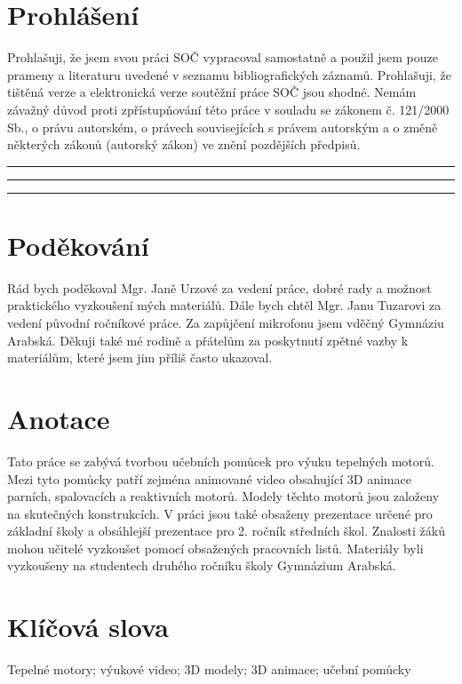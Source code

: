 \newpage

\section*{Prohlášení}
{Prohlašuji, že jsem svou práci SOČ vypracoval samostatně a použil jsem pouze prameny a literaturu uvedené v seznamu bibliografických záznamů.}\odst
{Prohlašuji, že tištěná verze a elektronická verze soutěžní práce SOČ jsou shodné.}\odst
{Nemám závažný důvod proti zpřístupňování této práce v souladu se zákonem č. 121/2000 Sb., o právu autorském, o právech souvisejících s právem autorským a o změně některých zákonů (autorský zákon) ve znění pozdějších předpisů.}\par
\vspace{2cm}
\noindent\rule{3cm}{0.4pt}
\noindent\rule{3cm}{0.4pt}
\hfill
{}
\noindent\rule{5cm}{0.4pt}

\newpage

\section*{Poděkování}
{Rád bych poděkoval Mgr. Janě Urzové za vedení práce, dobré rady a možnost praktického vyzkoušení mých materiálů. Dále bych chtěl Mgr. Janu Tuzarovi za vedení původní ročníkové práce. Za zapůjčení mikrofonu jsem vděčný Gymnáziu Arabská. Děkuji také mé rodině a přátelům za poskytnutí zpětné vazby k materiálům, které jsem jim příliš často ukazoval.}

\newpage

\section*{Anotace}
{Tato práce se zabývá tvorbou učebních pomůcek pro výuku tepelných motorů. Mezi tyto pomůcky patří zejména animované video obsahující 3D animace parních, spalovacích a reaktivních motorů. Modely těchto motorů jsou založeny na skutečných konstrukcích. V práci jsou také obsaženy prezentace určené pro základní školy a obsáhlejší prezentace pro 2. ročník středních škol. Znalosti žáků mohou učitelé vyzkoušet pomocí obsažených pracovních listů. Materiály byli vyzkoušeny na studentech druhého ročníku školy Gymnázium Arabská.}

\section*{Klíčová slova}
{Tepelné motory; výukové video; 3D modely; 3D animace; učební pomůcky}

